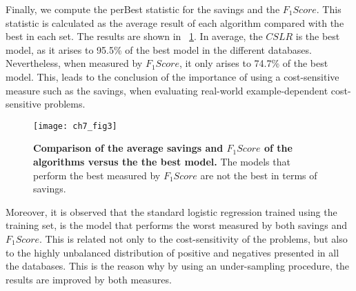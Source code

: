Finally, we compute the perBest statistic  for the savings and the $F_1Score$. This statistic is 
calculated as the average result of each algorithm compared with the best in each set. The results 
are shown in \figurename{~\ref{fig:7:comparison_per_best}}. In average, the $CSLR$ is the best 
model, as it arises to 95.5\% of the best model in the different databases. Nevertheless, when 
measured by $F_1Score$, it only arises to 74.7\% of the best model. This, leads to the conclusion 
of the importance of using a cost-sensitive measure such as the savings, when evaluating real-world 
example-dependent cost-sensitive problems. 

\begin{figure}[t!] 
  \centering
  \texttt{[image: ch7\_fig3]}
  \caption{\textbf{Comparison of the average savings and $F_1Score$ of the algorithms versus the 
    the best model.} The models that perform the best measured by $F_1Score$ are not the best 
  in terms of savings.}
  \label{fig:7:comparison_per_best}
\end{figure}

Moreover, it is observed that the standard logistic regression trained using the training set, is 
the model that performs the worst measured by both savings and $F_1Score$. This is related not only 
to the cost-sensitivity of the problems, but also to the highly unbalanced distribution of positive 
and negatives presented in all the databases. This is the reason why by using an under-sampling 
procedure, the results are improved by both measures.